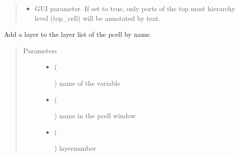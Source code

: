 \documentclass[a4paper,10pt,english]{sphinxmanual}
\begin{document}
\begin{fulllineitems}
\begin{quote}
\begin{description}
\begin{itemize}
\item {} 
 \textendash{} GUI parameter. If set to true, only ports of the top most hierarchy level (top\_cell) will be
annotated by text.

\end{itemize}

\end{description}\end{quote}

\begin{fulllineitems}
\label{\detokenize{photonics:kppc.photonics.PhotDevice.add_layer}}
Add a layer to the layer list of the pcell by name.
\begin{quote}\begin{description}
\item[{Parameters}] \leavevmode\begin{itemize}
\item {} 
 (%
\begin{footnote}[28]\sphinxAtStartFootnote
{}
%
\end{footnote}) \textendash{} name of the variable

\item {} 
 (%
\begin{footnote}[29]\sphinxAtStartFootnote
{}
%
\end{footnote}) \textendash{} name in the pcell window

\item {} 
 (%
\begin{footnote}[30]\sphinxAtStartFootnote
{}
%
\end{footnote}) \textendash{} layernumber


\end{itemize}
\end{description}
\end{quote}
\end{fulllineitems}
\end{fulllineitems}
\end{document}
